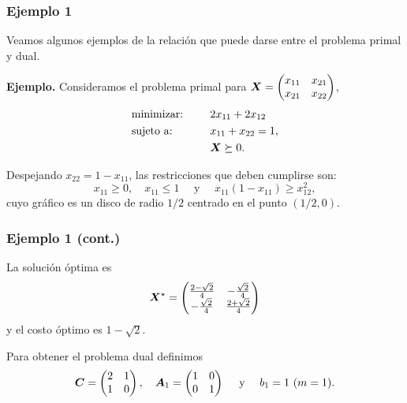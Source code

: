 \documentclass[aspectratio=169,12pt,spanish]{beamer}
\begin{document}

\begin{frame}
\frametitle{Ejemplo 1}

Veamos algunos ejemplos de la relación que puede darse entre el problema primal y dual.

\textbf{Ejemplo.} Consideramos el problema primal para $\bm{X} = \begin{pmatrix} x_{11} & x_{21} \\ x_{21} & x_{22} \end{pmatrix}$,
\begin{alignat*}{2}
  & \text{minimizar: }  & \quad & 2x_{11} + 2x_{12}   \\
   & \text{sujeto a: } & \quad & x_{11} + x_{22} = 1, \\
   & & &  \bm{X} \succeq 0.
\end{alignat*}

Despejando $x_{22} = 1 - x_{11}$, las restricciones que deben cumplirse son:
$$x_{11} \ge 0, \quad x_{11} \le 1 \quad \text{ y } \quad x_{11}(1-x_{11}) \ge x_{12}^2,
$$
cuyo gráfico es un disco de radio $1/2$ centrado en el punto $(1/2, 0)$.

\end{frame}


\begin{frame}
\frametitle{Ejemplo 1 (cont.)}

La solución óptima es
$$
\bm{X}^\star = \begin{pmatrix}
\frac{2 - \sqrt{2}}{4} & -\frac{\sqrt{2}}{4} \\
-\frac{\sqrt{2}}{4} & \frac{2 + \sqrt{2}}{4}
\end{pmatrix}
$$
y el costo óptimo es $1 - \sqrt{2}$.

Para obtener el problema dual definimos
$$\bm{C} = \begin{pmatrix}
2 & 1 \\ 1 & 0
\end{pmatrix}, \quad \bm{A}_1 = \begin{pmatrix}
1 & 0 \\ 0 & 1
\end{pmatrix}\quad \text{ y } \quad b_1 = 1 \ \text{($m = 1$)}.$$



\end{frame}

\end{document}
